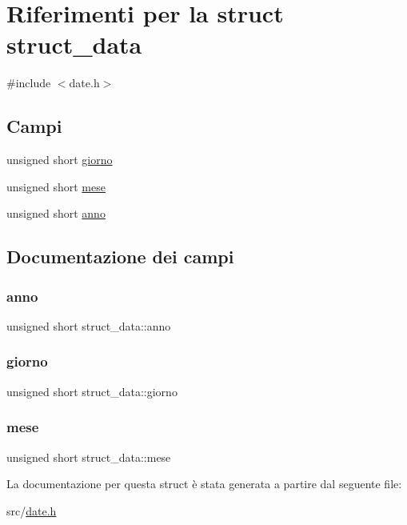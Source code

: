 \hypertarget{structstruct__data}{}\section{Riferimenti per la struct struct\+\_\+data}
\label{structstruct__data}


{\ttfamily \#include $<$date.\+h$>$}

\subsection*{Campi}
\begin{DoxyCompactItemize}
\item 
unsigned short \hyperlink{structstruct__data_ac1fcee81be6cd7637861ae379b38de4d}{giorno}
\item 
unsigned short \hyperlink{structstruct__data_a8d3b204dba0913dc99e2b5bf97b39d43}{mese}
\item 
unsigned short \hyperlink{structstruct__data_a857c626a787c4ff5e22f51732b9caf1c}{anno}
\end{DoxyCompactItemize}


\subsection{Documentazione dei campi}
\mbox{\label{structstruct__data_a857c626a787c4ff5e22f51732b9caf1c}} 
\subsubsection{\texorpdfstring{anno}{anno}}
{\footnotesize\ttfamily unsigned short struct\+\_\+data\+::anno}

\mbox{\label{structstruct__data_ac1fcee81be6cd7637861ae379b38de4d}} 
\subsubsection{\texorpdfstring{giorno}{giorno}}
{\footnotesize\ttfamily unsigned short struct\+\_\+data\+::giorno}

\mbox{\label{structstruct__data_a8d3b204dba0913dc99e2b5bf97b39d43}} 
\subsubsection{\texorpdfstring{mese}{mese}}
{\footnotesize\ttfamily unsigned short struct\+\_\+data\+::mese}



La documentazione per questa struct è stata generata a partire dal seguente file\+:\begin{DoxyCompactItemize}
\item 
src/\hyperlink{date_8h}{date.\+h}\end{DoxyCompactItemize}
